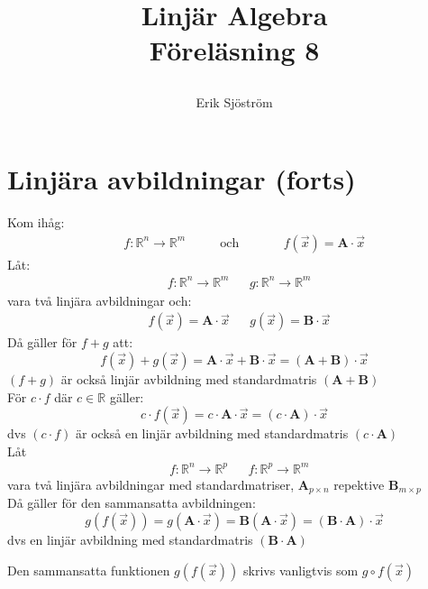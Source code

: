
\title{
	 Linjär Algebra\\
	 Föreläsning 8
    \author{Erik Sjöström}
}

\maketitle
\section{Linjära avbildningar (forts)} %
\label{sec:linj_ra_avbildningar_}
Kom ihåg:
\begin{align*}
&&f:\mathbb{R}^n \rightarrow \mathbb{R}^m
&&&\mbox{ och }
&&&&f(\vec{x}) = \mathbf{A} \cdot \vec{x}
\end{align*}
Låt:
\begin{align*}
&f:\mathbb{R}^n \rightarrow \mathbb{R}^m
&&g:\mathbb{R}^n \rightarrow \mathbb{R}^m
\end{align*}
vara två linjära avbildningar och:
\begin{align*}
&f(\vec{x}) = \mathbf{A} \cdot \vec{x}
&&g(\vec{x}) = \mathbf{B} \cdot \vec{x}
\end{align*}
Då gäller för $f+g$ att:
\[
    f(\vec{x}) + g(\vec{x}) = \mathbf{A} \cdot \vec{x} + \mathbf{B} \cdot \vec{x} = (\mathbf{A} + \mathbf{B}) \cdot \vec{x}
\]
$(f+g)$ är också linjär avbildning med standardmatris $(\mathbf{A}+\mathbf{B})$\\
För $c \cdot f$ där $c \in \mathbb{R}$ gäller:
\[
    c \cdot f(\vec{x}) = c \cdot \mathbf{A} \cdot \vec{x} = (c \cdot \mathbf{A}) \cdot \vec{x}
\]
dvs $(c \cdot f)$ är också en linjär avbildning med standardmatris $(c \cdot \mathbf{A})$\\
Låt 
\begin{align*}
&f:\mathbb{R}^n \rightarrow \mathbb{R}^p
&&f:\mathbb{R}^p \rightarrow \mathbb{R}^m
\end{align*}
vara två linjära avbildningar med standardmatriser, $\mathbf{A}_{p \times n}$ repektive $\mathbf{B}_{m \times p}$\\
Då gäller för den sammansatta avbildningen:
\[
    g(f(\vec{x})) = g(\mathbf{A} \cdot \vec{x}) = \mathbf{B}(\mathbf{A} \cdot \vec{x}) = (\mathbf{B} \cdot \mathbf{A}) \cdot \vec{x}
\]
dvs en linjär avbildning med standardmatris $(\mathbf{B} \cdot \mathbf{A})$
\begin{Rem}
    Den sammansatta funktionen $g(f(\vec{x}))$ skrivs vanligtvis som $g \circ f(\vec{x})$
\end{Rem}
\newpage
